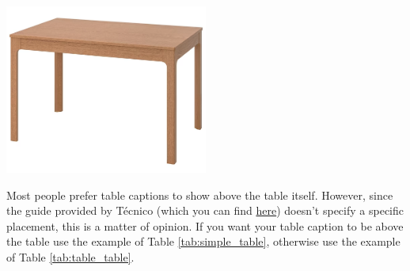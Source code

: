\begin{table}[!htb]
	\centering
	\includegraphics[width=0.5\textwidth]{images/table.png}
	\caption{Another simple table. As you can see anything can be a table in \LaTeX! Don't lose too much time trying to create all your tables using the tabular environment.}
	\label{tab:table_table}
\end{table}

\begin{tcolorbox}[title=A note on table captions]
	Most people prefer table captions to show above the table itself. However, since the guide provided by Técnico (which you can find \href{https://tecnico.ulisboa.pt/en/education/study-at-tecnico/academic-information/masters-dissertation/}{here}) doesn't specify a specific placement, this is a matter of opinion. If you want your table caption to be above the table use the example of Table \ref{tab:simple_table}, otherwise use the example of Table \ref{tab:table_table}.
\end{tcolorbox}
